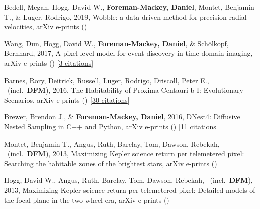 \item[{\color{numcolor}\scriptsize6}] Bedell, Megan, Hogg, David W., \textbf{Foreman-Mackey, Daniel}, Montet, Benjamin T., \& Luger, Rodrigo, 2019, Wobble: a data-driven method for precision radial velocities, arXiv e-prints ()

\item[{\color{numcolor}\scriptsize5}] Wang, Dun, Hogg, David W., \textbf{Foreman-Mackey, Daniel}, \& Sch{\"o}lkopf, Bernhard, 2017, A pixel-level model for event discovery in time-domain imaging, arXiv e-prints () [\href{http://adsabs.harvard.edu/abs/2017arXiv171002428W}{3 citations}]

\item[{\color{numcolor}\scriptsize4}] Barnes, Rory, Deitrick, Russell, Luger, Rodrigo, Driscoll, Peter E., \etal\ (incl.\ \textbf{DFM}), 2016, The Habitability of Proxima Centauri b I: Evolutionary Scenarios, arXiv e-prints () [\href{http://adsabs.harvard.edu/abs/2016arXiv160806919B}{30 citations}]

\item[{\color{numcolor}\scriptsize3}] Brewer, Brendon J., \& \textbf{Foreman-Mackey, Daniel}, 2016, DNest4: Diffusive Nested Sampling in C++ and Python, arXiv e-prints () [\href{http://adsabs.harvard.edu/abs/2016arXiv160603757B}{11 citations}]

\item[{\color{numcolor}\scriptsize2}] Montet, Benjamin T., Angus, Ruth, Barclay, Tom, Dawson, Rebekah, \etal\ (incl.\ \textbf{DFM}), 2013, Maximizing Kepler science return per telemetered pixel: Searching the habitable zones of the brightest stars, arXiv e-prints ()

\item[{\color{numcolor}\scriptsize1}] Hogg, David W., Angus, Ruth, Barclay, Tom, Dawson, Rebekah, \etal\ (incl.\ \textbf{DFM}), 2013, Maximizing Kepler science return per telemetered pixel: Detailed models of the focal plane in the two-wheel era, arXiv e-prints ()